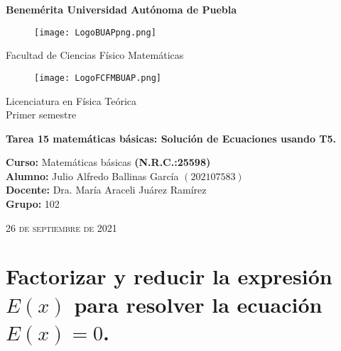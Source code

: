 \documentclass[12pt]{article}
\begin{document}
\thispagestyle{empty} 
\begin{center} \LARGE{\bf Benemérita Universidad Autónoma de Puebla} \\[0.5cm]
\begin{figure}[htb] \centering \texttt{[image: LogoBUAPpng.png]} \end{figure}
\LARGE{Facultad de Ciencias Físico Matemáticas}\\[0.5cm]
\begin{figure}[htb] \centering \texttt{[image: LogoFCFMBUAP.png]} \end{figure} 
\Large{Licenciatura en Física Teórica}\\[0.5cm]
\large{Primer semestre} \end{center}
\begin{center} { \Large \bfseries{Tarea 15 matemáticas básicas: Solución de Ecuaciones usando T5.}} \\ \end{center}
\large{\bf Curso:} Matemáticas básicas \textbf{(N.R.C.:25598)}\\
\large{\bf Alumno:} Julio Alfredo Ballinas García $\left(202107583\right)$ \\
\large{\bf Docente:} Dra. María Araceli Juárez Ramírez\\
\large{\bf Grupo:} 102\\ \begin{center} 
\vfill
\textsc{26 de septiembre de 2021} \end{center}  
\newpage
\sffamily

\section*{Factorizar y reducir la expresión $E(x)$ para resolver la ecuación $E(x)=0$.}
\end{document}
